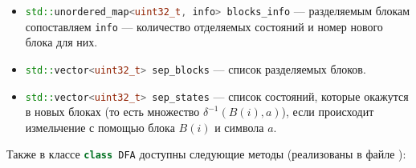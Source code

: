 \documentclass{article}
\begin{document}
\begin{itemize}
  \item \lstinline[language=C++]!std::unordered_map<uint32_t, info> blocks_info! --- разделяемым блокам сопоставляем \lstinline[language=C++]!info! --- количество отделяемых состояний и номер нового блока для них.
  \item \lstinline[language=C++]!std::vector<uint32_t> sep_blocks! --- список разделяемых блоков.
  \item \lstinline[language=C++]!std::vector<uint32_t> sep_states! --- список состояний, которые окажутся в новых блоках (то есть множество $\delta^{-1}(B(i), a)$), если происходит измельчение с помощью блока $B(i)$ и символа $a$.
\end{itemize}
Также в классе \lstinline[language=C++]!class DFA! доступны следующие методы (реализованы в файле ):
\end{document}
